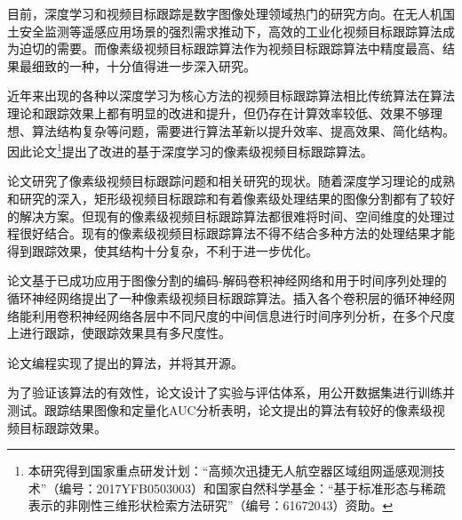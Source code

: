 
\begin{cabstract}
	目前，深度学习和视频目标跟踪是数字图像处理领域热门的研究方向。在无人机国土安全监测等遥感应用场景的强烈需求推动下，高效的工业化视频目标跟踪算法成为迫切的需要。而像素级视频目标跟踪算法作为视频目标跟踪算法中精度最高、结果最细致的一种，十分值得进一步深入研究。
	\par
	近年来出现的各种以深度学习为核心方法的视频目标跟踪算法相比传统算法在算法理论和跟踪效果上都有明显的改进和提升，但仍存在计算效率较低、效果不够理想、算法结构复杂等问题，需要进行算法革新以提升效率、提高效果、简化结构。因此论文\footnote{本研究得到国家重点研发计划：“高频次迅捷无人航空器区域组网遥感观测技术”（编号：2017YFB0503003）和国家自然科学基金：“基于标准形态与稀疏表示的非刚性三维形状检索方法研究”（编号：61672043）资助。}提出了改进的基于深度学习的像素级视频目标跟踪算法。
	\par
	论文研究了像素级视频目标跟踪问题和相关研究的现状。随着深度学习理论的成熟和研究的深入，矩形级视频目标跟踪和有着像素级处理结果的图像分割都有了较好的解决方案。但现有的像素级视频目标跟踪算法都很难将时间、空间维度的处理过程很好结合。现有的像素级视频目标跟踪算法不得不结合多种方法的处理结果才能得到跟踪效果，使其结构十分复杂，不利于进一步优化。
	\par
	论文基于已成功应用于图像分割的编码-解码卷积神经网络和用于时间序列处理的循环神经网络提出了一种像素级视频目标跟踪算法。插入各个卷积层的循环神经网络能利用卷积神经网络各层中不同尺度的中间信息进行时间序列分析，在多个尺度上进行跟踪，使跟踪效果具有多尺度性。
	\par
	论文编程实现了提出的算法，并将其开源。
	\par
	为了验证该算法的有效性，论文设计了实验与评估体系，用公开数据集进行训练并测试。跟踪结果图像和定量化AUC分析表明，论文提出的算法有较好的像素级视频目标跟踪效果。
\end{cabstract}

